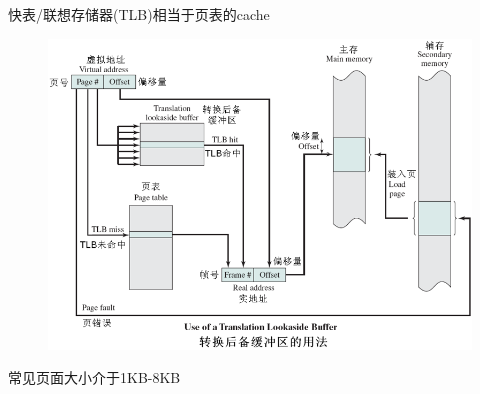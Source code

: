 快表/联想存储器(TLB)相当于页表的cache
\begin{figure}[H]
    \centering
    \includegraphics[width=0.6\linewidth]{fig/TLB.png}
\end{figure}

常见页面大小介于1KB-8KB

